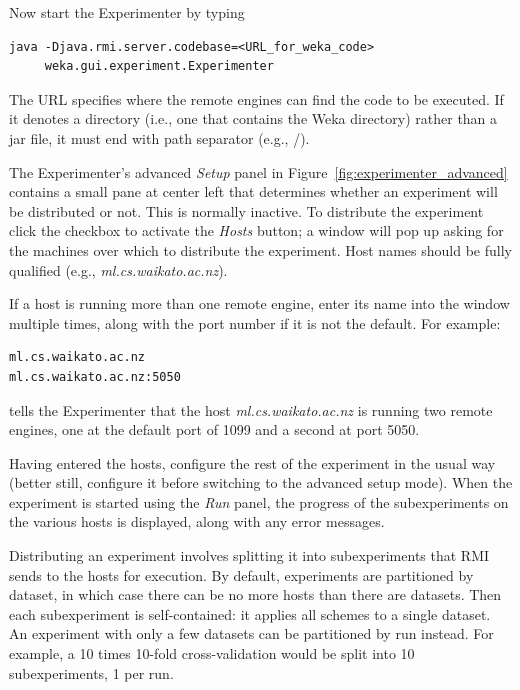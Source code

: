 Now start the Experimenter by typing

\begin{Verbatim}[fontsize=\footnotesize]
java -Djava.rmi.server.codebase=<URL_for_weka_code> 
     weka.gui.experiment.Experimenter
\end{Verbatim}

The URL specifies where the remote engines can find the code to be
executed. If it denotes a directory (i.e., one that contains the Weka
directory) rather than a jar file, it must end with path separator
(e.g., /).

The Experimenter's advanced \textit{Setup} panel in
Figure~\ref{fig:experimenter_advanced} contains a small pane at center
left that determines whether an experiment will be distributed or
not. This is normally inactive. To distribute the experiment click the
checkbox to activate the \textit{Hosts} button; a window will pop up asking for
the machines over which to distribute the experiment. Host names
should be fully qualified (e.g., \textit{ml.cs.waikato.ac.nz}).

If a host is running more than one remote engine, enter its name into
the window multiple times, along with the port number if it is not the
default. For example:

\begin{Verbatim}
ml.cs.waikato.ac.nz
ml.cs.waikato.ac.nz:5050
\end{Verbatim}

\noindent tells the Experimenter that the host
\textit{ml.cs.waikato.ac.nz} is running two remote engines, one at the
default port of 1099 and a second at port 5050.

Having entered the hosts, configure the rest of the experiment in the
usual way (better still, configure it before switching to the advanced
setup mode). When the experiment is started using the \textit{Run}
panel, the progress of the subexperiments on the various hosts is
displayed, along with any error messages.

Distributing an experiment involves splitting it into subexperiments
that RMI sends to the hosts for execution. By default, experiments are
partitioned by dataset, in which case there can be no more hosts than
there are datasets. Then each subexperiment is self-contained: it
applies all schemes to a single dataset. An experiment with only a few
datasets can be partitioned by run instead. For example, a 10 times
10-fold cross-validation would be split into 10 subexperiments, 1 per
run.

